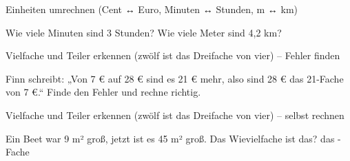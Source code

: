 \begin{aufgabe}{Einheiten umrechnen (Cent ↔ Euro, Minuten ↔ Stunden, m ↔ km)}
\begin{teile}
\teil Wie viele Minuten sind 3 Stunden? \leerfeld[min]
\teil Wie viele Meter sind 4,2 km? \leerfeld[m]
\end{teile}
\end{aufgabe}

\begin{aufgabe}{Vielfache und Teiler erkennen (zwölf ist das Dreifache von vier) – Fehler finden}
\begin{teile}
\teil Finn schreibt: „Von 7 € auf 28 € sind es 21 € mehr, also sind 28 € das 21-Fache von 7 €.“ Finde den Fehler und rechne richtig.
\end{teile}
\end{aufgabe}

\begin{aufgabe}{Vielfache und Teiler erkennen (zwölf ist das Dreifache von vier) – selbst rechnen}
\begin{teile}
\teil Ein Beet war 9 m² groß, jetzt ist es 45 m² groß. Das Wievielfache ist das? das \leerfeld -Fache
\end{teile}
\end{aufgabe}
